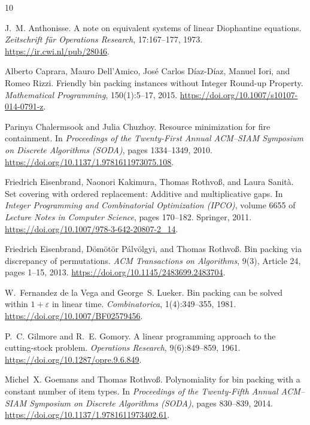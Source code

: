 \begin{thebibliography}{10}

J.~M. Anthonisse.
A note on equivalent systems of linear Diophantine equations.
\emph{Zeitschrift f\"ur Operations Research}, 17:167--177, 1973.
\url{https://ir.cwi.nl/pub/28046}.

Alberto Caprara, Mauro Dell'Amico, Jos\'e Carlos D\'iaz-D\'iaz,
Manuel Iori, and Romeo Rizzi.
Friendly bin packing instances without Integer Round-up Property.
\emph{Mathematical Programming}, 150(1):5--17, 2015.
\url{https://doi.org/10.1007/s10107-014-0791-z}.

Parinya Chalermsook and Julia Chuzhoy.
Resource minimization for fire containment.
In \emph{Proceedings of the Twenty-First Annual ACM--SIAM Symposium on
Discrete Algorithms (SODA)}, pages 1334--1349, 2010.
\url{https://doi.org/10.1137/1.9781611973075.108}.

Friedrich Eisenbrand, Naonori Kakimura, Thomas Rothvo\ss, and Laura Sanit\`a.
Set covering with ordered replacement: Additive and multiplicative gaps.
In \emph{Integer Programming and Combinatorial Optimization (IPCO)},
volume 6655 of \emph{Lecture Notes in Computer Science},
pages 170--182. Springer, 2011.
\url{https://doi.org/10.1007/978-3-642-20807-2_14}.

Friedrich Eisenbrand, D\"om\"ot\"or P\'alv\"olgyi, and Thomas Rothvo\ss.
Bin packing via discrepancy of permutations.
\emph{ACM Transactions on Algorithms}, 9(3), Article 24, pages 1--15, 2013.
\url{https://doi.org/10.1145/2483699.2483704}.

W.~Fernandez de la Vega and George~S. Lueker.
Bin packing can be solved within $1+\varepsilon$ in linear time.
\emph{Combinatorica}, 1(4):349--355, 1981.
\url{https://doi.org/10.1007/BF02579456}.

P.~C. Gilmore and R.~E. Gomory.
A linear programming approach to the cutting-stock problem.
\emph{Operations Research}, 9(6):849--859, 1961.
\url{https://doi.org/10.1287/opre.9.6.849}.

Michel~X. Goemans and Thomas Rothvo\ss.
Polynomiality for bin packing with a constant number of item types.
In \emph{Proceedings of the Twenty-Fifth Annual ACM--SIAM Symposium on
Discrete Algorithms (SODA)}, pages 830--839, 2014.
\url{https://doi.org/10.1137/1.9781611973402.61}.


\end{thebibliography}
